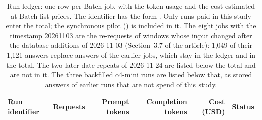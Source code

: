 \begin{table}[H]
\centering
\caption{Run ledger: one row per Batch job, with the token usage and the cost estimated at Batch list prices. The identifier has the form . Only runs paid in this study enter the total; the synchronous pilot () is included in it. The eight jobs with the timestamp 20261103 are the re-requests of windows whose input changed after the database additions of 2026-11-03 (Section~3.7 of the article): 1{,}049 of their 1{,}121 answers replace answers of the earlier jobs, which stay in the ledger and in the total. The two later-date repeats of 2026-11-24 are listed below the total and are not in it. The three backfilled o4-mini runs are listed below that, as stored answers of earlier runs that are not spend of this study.}
\label{tab:ledger}
\scriptsize
\setlength{\tabcolsep}{3pt}
\begin{tabular}{@{}p{4.9cm}rrrrl@{}}
\toprule
Run identifier & Requests & Prompt tokens & Completion tokens & Cost (USD) & Status \\
\midrule


\end{tabular}
\end{table}
